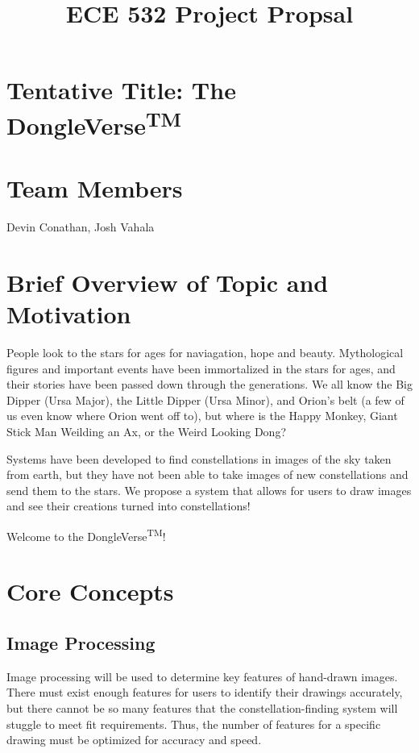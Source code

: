 \documentclass{article}
\title{ECE 532 Project Propsal}
\date{}
\author{}
\makeatletter
\let\saved@bibitem\@bibitem
\makeatother
\begin{document}
\begingroup
  \makeatletter
  \let\@bibitem\saved@bibitem
  
\endgroup

\maketitle

\section{Tentative Title: The DongleVerse\textsuperscript{TM\textregistered}}
\section{Team Members}
Devin Conathan, Josh Vahala

\section{Brief Overview of Topic and Motivation}
People look to the stars for ages for naviagation, hope and beauty. Mythological figures and important events have been immortalized in the stars for ages, and their stories have been passed down through the generations. We all know the Big Dipper (Ursa Major), the Little Dipper (Ursa Minor), and Orion's belt (a few of us even know where Orion went off to), but where is the Happy Monkey, Giant Stick Man Weilding an Ax, or the Weird Looking Dong? \par
Systems have been developed to find constellations in images of the sky taken from earth, but they have not been able to take images of new constellations and send them to the stars. We propose a system that allows for users to draw images and see their creations turned into constellations! \par
Welcome to the DongleVerse\textsuperscript{TM\textregistered}! 

\section{Core Concepts}

\subsection{Image Processing}
Image processing will be used to determine key features of hand-drawn images. There must exist enough features for users to identify their drawings accurately, but there cannot be so many features that the constellation-finding system will stuggle to meet fit requirements. Thus, the number of features for a specific drawing must be optimized for accuracy and speed.
\end{document}
